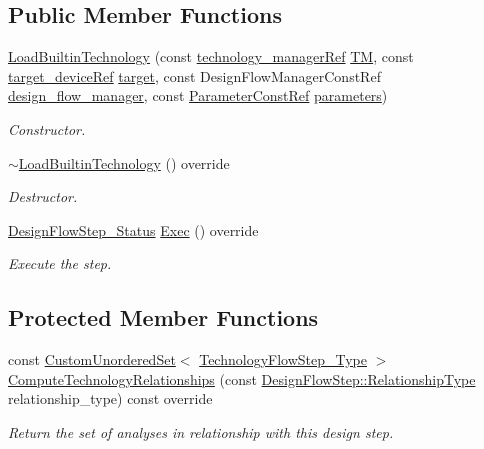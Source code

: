 \subsection*{Public Member Functions}
\begin{DoxyCompactItemize}
\item 
\hyperlink{classLoadBuiltinTechnology_a72003dba9c64ce68c9f5c19c6353e39d}{Load\+Builtin\+Technology} (const \hyperlink{technology__manager_8hpp_a4b9ecd440c804109c962654f9227244e}{technology\+\_\+manager\+Ref} \hyperlink{classTechnologyFlowStep_a4aeea30129ed65348c3bad932b3a135b}{TM}, const \hyperlink{target__device_8hpp_acedb2b7a617e27e6354a8049fee44eda}{target\+\_\+device\+Ref} \hyperlink{classTechnologyFlowStep_a1a16880c55bddc3f9dbc495636d7a8cb}{target}, const Design\+Flow\+Manager\+Const\+Ref \hyperlink{classDesignFlowStep_ab770677ddf087613add30024e16a5554}{design\+\_\+flow\+\_\+manager}, const \hyperlink{Parameter_8hpp_a37841774a6fcb479b597fdf8955eb4ea}{Parameter\+Const\+Ref} \hyperlink{classDesignFlowStep_a802eaafe8013df706370679d1a436949}{parameters})
\begin{DoxyCompactList}\small\item\em Constructor. \end{DoxyCompactList}\item 
\hyperlink{classLoadBuiltinTechnology_a3eedd407b5c1f59fc4b1ca9e5a5fca19}{$\sim$\+Load\+Builtin\+Technology} () override
\begin{DoxyCompactList}\small\item\em Destructor. \end{DoxyCompactList}\item 
\hyperlink{design__flow__step_8hpp_afb1f0d73069c26076b8d31dbc8ebecdf}{Design\+Flow\+Step\+\_\+\+Status} \hyperlink{classLoadBuiltinTechnology_ab0fb4115da509336a908c1ea53e0140c}{Exec} () override
\begin{DoxyCompactList}\small\item\em Execute the step. \end{DoxyCompactList}\end{DoxyCompactItemize}
\subsection*{Protected Member Functions}
\begin{DoxyCompactItemize}
\item 
const \hyperlink{classCustomUnorderedSet}{Custom\+Unordered\+Set}$<$ \hyperlink{technology__flow__step_8hpp_a65208cfec963a7d7def292f9db428292}{Technology\+Flow\+Step\+\_\+\+Type} $>$ \hyperlink{classLoadBuiltinTechnology_af45215c91a262842995c29fb1e79c8c9}{Compute\+Technology\+Relationships} (const \hyperlink{classDesignFlowStep_a723a3baf19ff2ceb77bc13e099d0b1b7}{Design\+Flow\+Step\+::\+Relationship\+Type} relationship\+\_\+type) const override
\begin{DoxyCompactList}\small\item\em Return the set of analyses in relationship with this design step. \end{DoxyCompactList}\end{DoxyCompactItemize}
